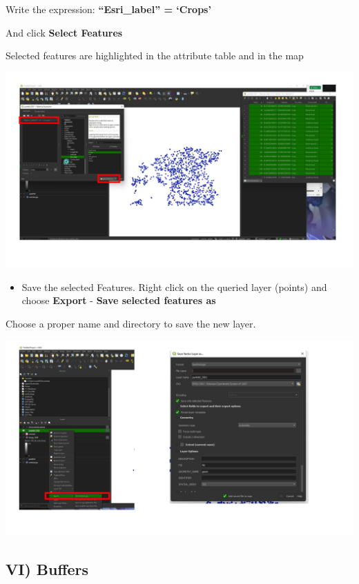 \documentclass[
  letterpaper,
  DIV=11,
  numbers=noendperiod]{scrartcl}
\providecommand{\tightlist}{%
  \setlength{\itemsep}{0pt}\setlength{\parskip}{0pt}}\usepackage{longtable,booktabs,array}
\begin{document}
Write the expression: \textbf{``Esri\_label'' = `Crops'}

And click \textbf{Select Features}

Selected features are highlighted in the attribute table and in the map

\includegraphics{Lab1/qgis_ss/QGIS_ss18.png}

\begin{itemize}
\tightlist
\item
  Save the selected Features. Right click on the queried layer (points)
  and choose \textbf{Export} - \textbf{Save selected features as}
\end{itemize}

Choose a proper name and directory to save the new layer.

\includegraphics{Lab1/qgis_ss/QGIS_ss19.png}

\hypertarget{vi-buffers}{%
\subsection{VI) Buffers}\label{vi-buffers}}
\end{document}
